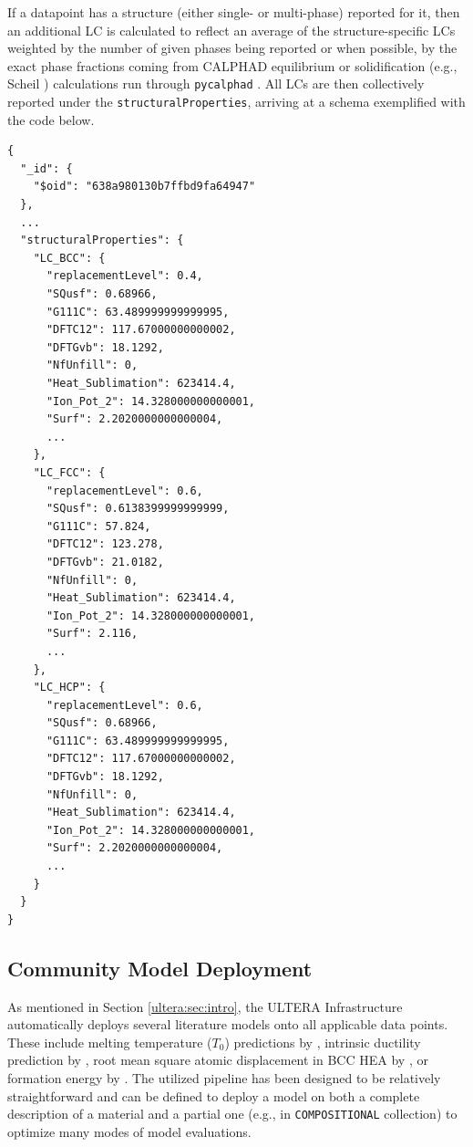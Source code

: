 If a datapoint has a structure (either single- or multi-phase) reported for it, then an additional LC is calculated to reflect an average of the structure-specific LCs weighted by the number of given phases being reported or when possible, by the exact phase fractions coming from CALPHAD equilibrium or solidification (e.g., Scheil \cite{Bocklund2020ExperimentalMaterials}) calculations run through \texttt{pycalphad} \cite{Otis2017Pycalphad:Python}. All LCs are then collectively reported under the \texttt{structuralProperties}, arriving at a schema exemplified with the code below.

\begin{verbatim}
{
  "_id": {
    "$oid": "638a980130b7ffbd9fa64947"
  },
  ...
  "structuralProperties": {
    "LC_BCC": {
      "replacementLevel": 0.4,
      "SQusf": 0.68966,
      "G111C": 63.489999999999995,
      "DFTC12": 117.67000000000002,
      "DFTGvb": 18.1292,
      "NfUnfill": 0,
      "Heat_Sublimation": 623414.4,
      "Ion_Pot_2": 14.328000000000001,
      "Surf": 2.2020000000000004,
      ...
    },
    "LC_FCC": {
      "replacementLevel": 0.6,
      "SQusf": 0.6138399999999999,
      "G111C": 57.824,
      "DFTC12": 123.278,
      "DFTGvb": 21.0182,
      "NfUnfill": 0,
      "Heat_Sublimation": 623414.4,
      "Ion_Pot_2": 14.328000000000001,
      "Surf": 2.116,
      ...
    },
    "LC_HCP": {
      "replacementLevel": 0.6,
      "SQusf": 0.68966,
      "G111C": 63.489999999999995,
      "DFTC12": 117.67000000000002,
      "DFTGvb": 18.1292,
      "NfUnfill": 0,
      "Heat_Sublimation": 623414.4,
      "Ion_Pot_2": 14.328000000000001,
      "Surf": 2.2020000000000004,
      ...
    }
  }
}
\end{verbatim}



\subsection{Community Model Deployment} \label{ultera:ssec:communitymodels}

As mentioned in Section \ref{ultera:sec:intro}, the ULTERA Infrastructure automatically deploys several literature models onto all applicable data points. These include melting temperature ($T_0$) predictions by \citet{Hong2022MeltingMaterials}, intrinsic ductility prediction by \citet{Hu2021ScreeningAlloys}, root mean square atomic displacement in BCC HEA by \citet{Tandoc2023MiningAlloys}, or formation energy by \citet{Krajewski2022ExtensibleNetworks}. The utilized pipeline has been designed to be relatively straightforward and can be defined to deploy a model on both a complete description of a material and a partial one (e.g., in \texttt{COMPOSITIONAL} collection) to optimize many modes of model evaluations.

